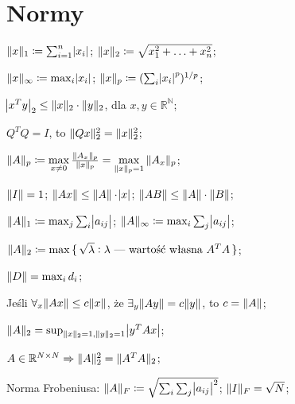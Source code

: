 \section{Normy}


\entry
$\|x\|_1 \coloneqq \sum^n_{i=1}\abs{x_i}$;
\entry
$\|x\|_2 \coloneqq \sqrt{x_1^2+\ldots + x_n^2}$;

\entry
$\|x\|_\infty \coloneqq \max_{i}\abs{x_i}$;
\entry
$\|x\|_p \coloneqq (\sum_i\abs{x_i}^p)^{1/p}$;

\entry
$\abs{x^Ty}_2 \leq \|x\|_2\cdot\|y\|_2$, dla $x,y\in\mathbb{R^N}$;

\entry
$Q^TQ=I$, to $\|Qx\|^2_2=\|x\|^2_2$;


\entry
$\|A\|_p \coloneqq \max\limits_{x\neq 0} \frac{\|A_x\|_p}{\|x\|_p} = \max\limits_{\|x\|_p = 1} \|A_x\|_p$;

\entry
$\|I\| = 1$;
\entry
$\|Ax\| \leq \|A\| \cdot \abs{x}$;
\entry
$\|AB\| \leq \|A\| \cdot \|B\|$;

\entry
$\|A\|_1 \coloneqq \max_j\sum_i\abs{a_{ij}}$;
\entry
$\|A\|_\infty \coloneqq \max_i\sum_j\abs{a_{ij}}$;

\entry
$\|A\|_2 \coloneqq \max\set{\sqrt{\lambda} : \lambda\text{ --- wartość własna } A^TA}$;

\entry
$\|D\| = \max_i d_i$;

\entry
Jeśli $\forall_{x} \|Ax\|\leq c\|x\|$, że $\exists_y \|Ay\| = c\|y\|$, to $c=\|A\|$;

\entry
$\|A\|_2 = \sup_{\|x\|_2=1, \|y\|_2=1}\abs{y^TAx}$;

\entry
$A\in\mathbb{R}^{N\times N} \Rightarrow \|A\|^2_2=\|A^TA\|_2$;


\entry
Norma Frobeniusa: $\|A\|_F \coloneqq \sqrt{\sum_i\sum_j\abs{a_{ij}}^2}$; $\|I\|_F=\sqrt{N}$;



